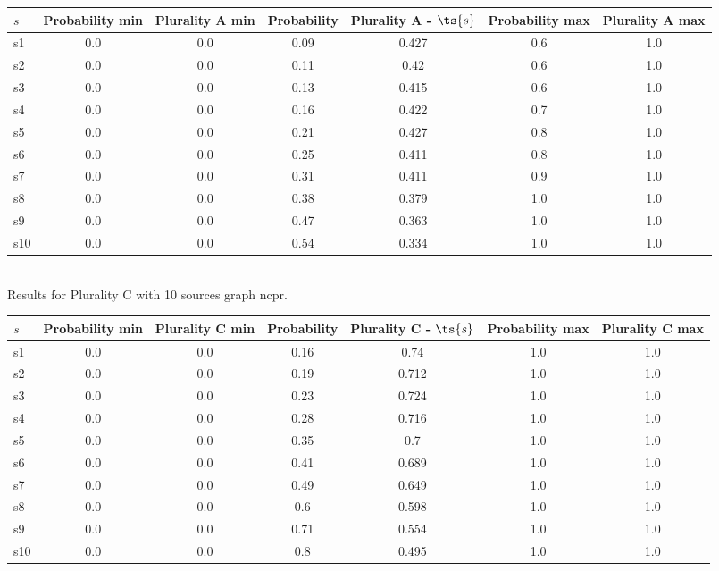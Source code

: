 \documentclass{article}
\begin{document}
\noindent\begin{tabular}{|l|c|c|c|c|c|c|}
\hline
$s$& Probability min & Plurality A min & Probability & Plurality A - $\ts{s}$ & Probability max & Plurality A max\\
\hline
s1 &0.0 & 0.0 & 0.09 & 0.427 & 0.6 & 1.0\\
\hline
s2 &0.0 & 0.0 & 0.11 & 0.42 & 0.6 & 1.0\\
\hline
s3 &0.0 & 0.0 & 0.13 & 0.415 & 0.6 & 1.0\\
\hline
s4 &0.0 & 0.0 & 0.16 & 0.422 & 0.7 & 1.0\\
\hline
s5 &0.0 & 0.0 & 0.21 & 0.427 & 0.8 & 1.0\\
\hline
s6 &0.0 & 0.0 & 0.25 & 0.411 & 0.8 & 1.0\\
\hline
s7 &0.0 & 0.0 & 0.31 & 0.411 & 0.9 & 1.0\\
\hline
s8 &0.0 & 0.0 & 0.38 & 0.379 & 1.0 & 1.0\\
\hline
s9 &0.0 & 0.0 & 0.47 & 0.363 & 1.0 & 1.0\\
\hline
s10 &0.0 & 0.0 & 0.54 & 0.334 & 1.0 & 1.0\\
\hline
\end{tabular}\\

\noindent Results for Plurality C with 10 sources graph ncpr.

\noindent\begin{tabular}{|l|c|c|c|c|c|c|}
\hline
$s$& Probability min & Plurality C min & Probability & Plurality C - $\ts{s}$ & Probability max & Plurality C max\\
\hline
s1 &0.0 & 0.0 & 0.16 & 0.74 & 1.0 & 1.0\\
\hline
s2 &0.0 & 0.0 & 0.19 & 0.712 & 1.0 & 1.0\\
\hline
s3 &0.0 & 0.0 & 0.23 & 0.724 & 1.0 & 1.0\\
\hline
s4 &0.0 & 0.0 & 0.28 & 0.716 & 1.0 & 1.0\\
\hline
s5 &0.0 & 0.0 & 0.35 & 0.7 & 1.0 & 1.0\\
\hline
s6 &0.0 & 0.0 & 0.41 & 0.689 & 1.0 & 1.0\\
\hline
s7 &0.0 & 0.0 & 0.49 & 0.649 & 1.0 & 1.0\\
\hline
s8 &0.0 & 0.0 & 0.6 & 0.598 & 1.0 & 1.0\\
\hline
s9 &0.0 & 0.0 & 0.71 & 0.554 & 1.0 & 1.0\\
\hline
s10 &0.0 & 0.0 & 0.8 & 0.495 & 1.0 & 1.0\\
\hline
\end{tabular}\\
\end{document}
